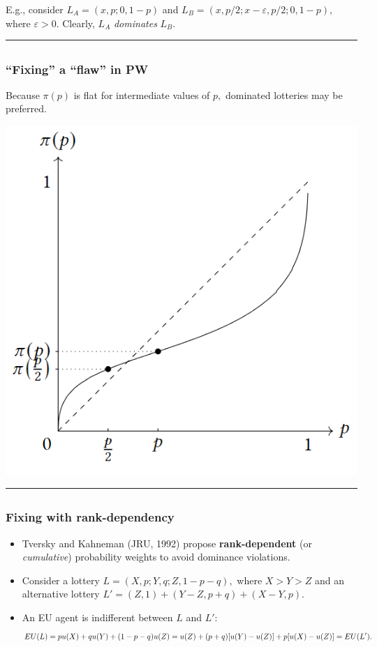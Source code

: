 \documentclass[
  letterpaper,
  DIV=11,
  numbers=noendperiod]{scrartcl}
\providecommand{\tightlist}{%
  \setlength{\itemsep}{0pt}\setlength{\parskip}{0pt}}\usepackage{longtable,booktabs,array}
\begin{document}
E.g., consider \(L_A = (x, p; 0, 1-p)\) and
\(L_B = (x, p/2; x - \varepsilon, p/2; 0, 1-p),\) where
\(\varepsilon > 0\). Clearly, \(L_A\) \emph{dominates} \(L_B\).

\begin{center}\rule{0.5\linewidth}{0.5pt}\end{center}

\subsection{}\label{section-7}

\subsubsection{``Fixing'' a ``flaw'' in PW}\label{fixing-a-flaw-in-pw-3}

Because \(\pi(p)\) is flat for intermediate values of \(p,\) dominated
lotteries may be preferred.

\includegraphics[width=0.5\linewidth,height=\textheight,keepaspectratio]{figures/Dominance.png}

\begin{center}\rule{0.5\linewidth}{0.5pt}\end{center}

\subsection{}\label{section-8}

\subsubsection{Fixing with
rank-dependency}\label{fixing-with-rank-dependency}

\begin{itemize}
\tightlist
\item
  Tversky and Kahneman (JRU, 1992) propose \textbf{rank-dependent} (or
  \emph{cumulative}) probability weights to avoid dominance violations.
\item
  Consider a lottery \(L = (X, p; Y, q; Z, 1-p-q),\) where \(X>Y>Z\) and
  an alternative lottery \(L' = (Z,1) + (Y-Z, p + q) + (X-Y,p).\)
\item
  An EU agent is indifferent between \(L\) and \(L':\) \[
  EU(L) = p u(X) + q u(Y) + (1-p-q)u(Z)  \\
  = u(Z) + (p+q)[u(Y) - u(Z)] + p[u(X) - u(Z)] = EU(L').
  \]
\end{itemize}
\end{document}
